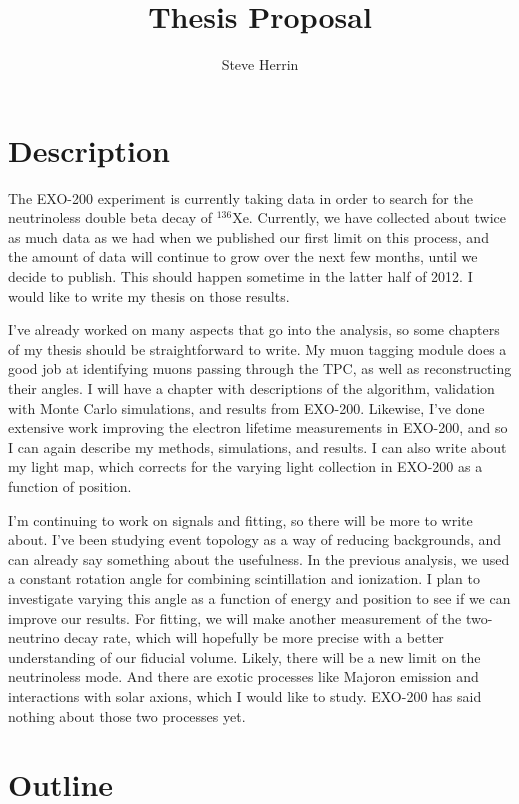 \documentclass[12pt,letterpaper,onecolumn]{article}
\title{Thesis Proposal}
\author{Steve Herrin}
\newcommand{\isotope}[2]{\(^{#1}\)#2}
\begin{document}
\maketitle
\setlength{\parskip}{9pt}

\section{Description}
The EXO-200 experiment is currently taking data in order to search for the neutrinoless double beta decay of \isotope{136}{Xe}. Currently, we have collected about twice as much data as we had when we published our first limit on this process, and the amount of data will continue to grow over the next few months, until we decide to publish. This should happen sometime in the latter half of 2012. I would like to write my thesis on those results.

I've already worked on many aspects that go into the analysis, so some chapters of my thesis should be straightforward to write. My muon tagging module does a good job at identifying muons passing through the TPC, as well as reconstructing their angles. I will have a chapter with descriptions of the algorithm, validation with Monte Carlo simulations, and results from EXO-200. Likewise, I've done extensive work improving the electron lifetime measurements in EXO-200, and so I can again describe my methods, simulations, and results. I can also write about my light map, which corrects for the varying light collection in EXO-200 as a function of position.

I'm continuing to work on signals and fitting, so there will be more to write about. I've been studying event topology as a way of reducing backgrounds, and can already say something about the usefulness. In the previous analysis, we used a constant rotation angle for combining scintillation and ionization. I plan to investigate varying this angle as a function of energy and position to see if we can improve our results. For fitting, we will make another measurement of the two-neutrino decay rate, which will hopefully be more precise with a better understanding of our fiducial volume. Likely, there will be a new limit on the neutrinoless mode. And there are exotic processes like Majoron emission and interactions with solar axions, which I would like to study. EXO-200 has said nothing about those two processes yet.

\newpage

\section{Outline}
\end{document}
